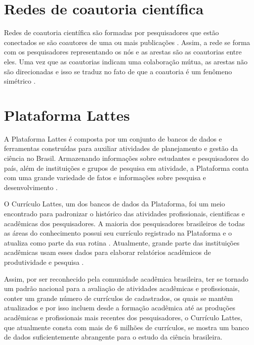 \section{Redes de coautoria científica}

Redes de coautoria científica são formadas por pesquisadores que estão conectados se são coautores de uma ou mais publicações \cite{newman2001structure}. Assim, a rede se forma com os pesquisadores representando os nós e as arestas são as coautorias entre eles. Uma vez que as coautorias indicam uma colaboração mútua, as arestas não são direcionadas e isso se traduz no fato de que a coautoria é um fenômeno simétrico \cite{glanzel2003bibliometrics}.

\section{Plataforma Lattes}

A Plataforma Lattes é composta por um conjunto de bancos de dados e ferramentas construídas para auxiliar atividades de planejamento e gestão da ciência no Brasil. Armazenando informações sobre estudantes e pesquisadores do país, além de instituições e grupos de pesquisa em atividade, a Plataforma conta com uma grande variedade de fatos e informações sobre pesquisa e desenvolvimento \cite{medeiros2013dynamics}.

O Currículo Lattes, um dos bancos de dados da Plataforma, foi um meio encontrado para padronizar o histórico das atividades profissionais, cientificas e acadêmicas dos pesquisadores. A maioria dos pesquisadores brasileiros de todas as áreas do conhecimento possui seu currículo registrado na Plataforma \cite{mena2014brazilian} e o atualiza como parte da sua rotina \cite{medeiros2013dynamics}. Atualmente, grande parte das instituições acadêmicas usam esses dados para elaborar relatórios acadêmicos de produtividade e pesquisa \cite{mena2009scriptlattes}.

Assim, por ser reconhecido pela comunidade acadêmica brasileira, ter se tornado um padrão nacional para a avaliação de atividades acadêmicas e profissionais, conter um grande número de currículos de cadastrados, os quais se mantêm atualizados e por isso incluem desde a formação acadêmica até as produções acadêmicas e profissionais mais recentes dos pesquisadores, o Currículo Lattes, que atualmente consta com mais de 6 milhões de currículos, se mostra um banco de dados suficientemente abrangente para o estudo da ciência brasileira.

